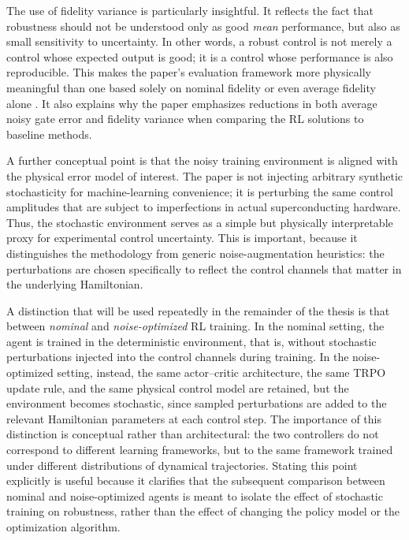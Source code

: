 The use of fidelity variance is particularly insightful. It reflects the fact that robustness should not be understood only as good \emph{mean} performance, but also as small sensitivity to uncertainty. In other words, a robust control is not merely a control whose expected output is good; it is a control whose performance is also reproducible. This makes the paper's evaluation framework more physically meaningful than one based solely on nominal fidelity or even average fidelity alone \cite{Niu2019}. It also explains why the paper emphasizes reductions in both average noisy gate error and fidelity variance when comparing the RL solutions to baseline methods.

A further conceptual point is that the noisy training environment is aligned with the physical error model of interest. The paper is not injecting arbitrary synthetic stochasticity for machine-learning convenience; it is perturbing the same control amplitudes that are subject to imperfections in actual superconducting hardware. Thus, the stochastic environment serves as a simple but physically interpretable proxy for experimental control uncertainty. This is important, because it distinguishes the methodology from generic noise-augmentation heuristics: the perturbations are chosen specifically to reflect the control channels that matter in the underlying Hamiltonian.


A distinction that will be used repeatedly in the remainder of the thesis is that between \emph{nominal} and \emph{noise-optimized} RL training. In the nominal setting, the agent is trained in the deterministic environment, that is, without stochastic perturbations injected into the control channels during training. In the noise-optimized setting, instead, the same actor--critic architecture, the same TRPO update rule, and the same physical control model are retained, but the environment becomes stochastic, since sampled perturbations are added to the relevant Hamiltonian parameters at each control step. The importance of this distinction is conceptual rather than architectural: the two controllers do not correspond to different learning frameworks, but to the same framework trained under different distributions of dynamical trajectories. Stating this point explicitly is useful because it clarifies that the subsequent comparison between nominal and noise-optimized agents is meant to isolate the effect of stochastic training on robustness, rather than the effect of changing the policy model or the optimization algorithm.

